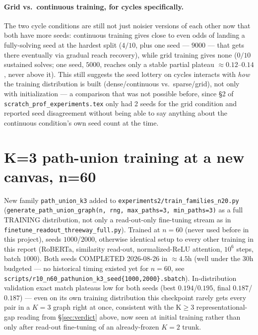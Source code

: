 \documentclass[11pt,a4paper]{article}
\begin{document}
\paragraph{Grid vs.\ continuous training, for cycles specifically.} The two cycle conditions
are still not just noisier versions of each other now that both have more seeds: continuous
training gives close to even odds of landing a fully-solving seed at the hardest split
($4/10$, plus one seed --- $9000$ --- that gets there eventually via gradual reach recovery),
while grid training gives none ($0/10$ sustained solves; one seed, $5000$, reaches only a
stable partial plateau $\approx0.12$--$0.14$, never above it). This still suggests the seed
lottery on cycles interacts with \emph{how} the training distribution is built
(dense/continuous vs.\ sparse/grid), not only with initialization --- a comparison that was
not possible before, since \S2 of \texttt{scratch\_prof\_experiments.tex} only had 2 seeds for
the grid condition and reported seed disagreement without being able to say anything about the
continuous condition's own seed
count at the time.

\section{K=3 path-union training at a new canvas, n=60}
\label{sec:n60}

\begin{center}
\end{center}

New family \texttt{path\_union\_k3} added to \texttt{experiments2/train\_families\_n20.py}
(\texttt{generate\_path\_union\_graph(n, rng, max\_paths{=}3, min\_paths{=}3)} as a full
TRAINING distribution, not only a read-out-only fine-tuning stream as in
\texttt{finetune\_readout\_threeway\_full.py}). Trained at $n{=}60$ (never used before in this
project), seeds $1000$/$2000$, otherwise identical setup to every other training in this
report (RoBERTa, similarity read-out, normalized-ReLU attention, $10^6$ steps, batch $1000$).
Both seeds COMPLETED 2026-08-26 in $\approx4.5$h (well under the $30$h budgeted --- no
historical timing existed yet for $n{=}60$, see \texttt{scripts/r10\_n60\_pathunion\_k3\_seed\{1000,2000\}.sbatch}).
In-distribution validation exact match plateaus low for both seeds (best $0.194$/$0.195$,
final $0.187$/$0.187$) --- even on its own training distribution this checkpoint rarely gets
every pair in a $K{=}3$ graph right at once, consistent with the K$\geq$3 representational-gap
reading from \S\ref{sec:verdict} above, now seen at initial training rather than only after
read-out fine-tuning of an already-frozen $K{=}2$ trunk.
\end{document}

